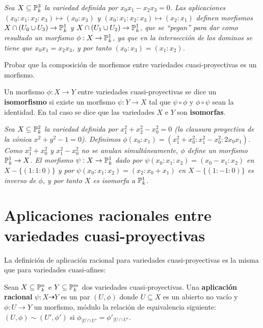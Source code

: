 \documentclass[ACGA.tex]{subfiles}
\begin{document}
\begin{ejs}
 \emph{Sea $X\subseteq\mathbb{P}^3_k$ la variedad definida por $x_0x_1-x_2x_3=0$. Las aplicaciones $(x_0:x_1:x_2:x_3)\mapsto (x_0:x_3)$ y $(x_0:x_1:x_2:x_3)\mapsto (x_2:x_1)$ definen morfismos $X\cap (U_0\cup U_3)\to\mathbb{P}^1_k$ y $X\cap (U_1\cup U_2)\to\mathbb{P}^1_k$, que se ``pegan'' para dar como resultado un morfismo $\phi:X\to\mathbb{P}^1_k$, ya que en la intersección de los dominos se tiene que $x_0x_1=x_2x_3$, y por tanto $(x_0:x_3)=(x_1:x_2)$.
}
\end{ejs}

\begin{ejer}
 Probar que la composición de morfismos entre variedades cuasi-proyectivas es un morfismo.
\end{ejer}


\begin{defi}
 Un morfismo $\phi:X\to Y$ entre variedades cuasi-proyectivas se dice un {\bf isomorfismo} si existe un morfismo $\psi:Y\to X$ tal que $\psi\circ\phi$ y $\phi\circ\psi$ sean la identidad. En tal caso se dice que las variedades $X$ e $Y$ son {\bf isomorfas}.
\end{defi}

\begin{ejs}
 \emph{Sea $X\subseteq\mathbb{P}^2_k$ la variedad definida por $x_1^2+x_2^2-x_0^2=0$ (la clausura proyectiva de la cónica $x^2+y^2-1=0$). Definimos $\phi(x_0:x_1)=(x_1^2+x_0^2:x_1^2-x_0^2:2x_0x_1)$. Como $x_1^2+x_0^2$ y $x_1^2-x_0^2$ no se anulan simultáneamente, $\phi$ define un morfismo $\mathbb{P}^1_k\to X$. El morfismo $\psi:X\to\mathbb{P}^1_k$ dado por $\psi(x_0:x_1:x_2)=(x_0-x_1:x_2)$ en $X-\{(1:1:0)\}$ y por $\psi(x_0:x_1:x_2)=(x_2:x_0+x_1)$ en $X-\{(1:-1:0)\}$ es inverso de $\phi$, y por tanto $X$ es isomorfa a $\mathbb{P}^1_k$.}
\end{ejs}

\section{Aplicaciones racionales entre variedades cuasi-proyectivas}

La definición de aplicación racional para variedades cuasi-proyectivas es la misma que para variedades cuasi-afines:

\begin{defi}
 Sean $X\subseteq\mathbb{P}^n_k$ e $Y\subseteq\mathbb{P}^m_k$ dos variedades cuasi-proyectivas. Una {\bf aplicación racional} $\psi:X\dashrightarrow Y$ es un par $(U,\phi)$ donde $U\subseteq X$ es un abierto no vacío y $\phi:U\to Y$ un morfismo, módulo la relación de equivalencia siguiente: $(U,\phi)\sim(U',\phi')$ si $\phi_{|U\cap U'}=\phi'_{|U\cap U'}$.
\end{defi}
\end{document}
